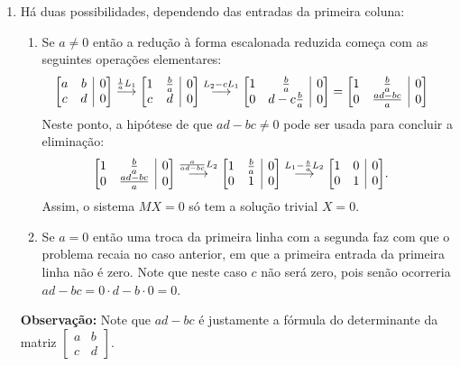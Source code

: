 \documentclass[12pt,a4paper]{article}
\makeatletter
\newenvironment{amatrix}[1]{%
  \left[\begin{array}{@{}*{#1}{c}|c@{}}
}{%
  \end{array}\right]
}
\newcommand{\grstep}[2][\relax]{%
   \ensuremath{\mathrel{
       {\mathop{\longrightarrow}\limits^{#2\mathstrut}_{
                                     \begin{subarray}{l} #1 \end{subarray}}}}}}
\makeatother
\begin{document}
\begin{enumerate}
\item Há duas possibilidades, dependendo das entradas da primeira coluna:
\begin{enumerate}
\item Se $a \neq 0$ então a redução à forma escalonada reduzida começa com as seguintes operações elementares:
\begin{align*}
\begin{amatrix}{2}
a & b & 0 \\
c & d & 0
\end{amatrix}
&
\grstep{ \frac{1}{a} L_1 }
\begin{amatrix}{2}
1 & \frac{b}{a} & 0 \\
c & d & 0
\end{amatrix}
\grstep{ L_2 - c L_1 }
\begin{amatrix}{2}
1 & \frac{b}{a} & 0 \\
0 & d-c\frac{b}{a} & 0
\end{amatrix}
=
\begin{amatrix}{2}
1 & \frac{b}{a} & 0 \\
0 & \frac{ad-bc}{a} & 0
\end{amatrix}
\end{align*}
Neste ponto, a hipótese de que $ad-bc \neq 0$ pode ser usada para concluir a eliminação:
\begin{align*}
\begin{amatrix}{2}
1 & \frac{b}{a} & 0 \\
0 & \frac{ad-bc}{a} & 0
\end{amatrix}
&
\grstep{ \frac{a}{ad-bc} L_2 }
\begin{amatrix}{2}
1 & \frac{b}{a} & 0 \\
0 & 1 & 0
\end{amatrix}
\grstep{ L_1 - \frac{b}{a} L_2 }
\begin{amatrix}{2}
1 & 0 & 0 \\
0 & 1 & 0
\end{amatrix}.
\end{align*}
Assim, o sistema $MX = 0$ só tem a solução trivial $X = 0$.

\item Se $a = 0$ então uma troca da primeira linha com a segunda faz com que o problema recaia no caso anterior, em que a primeira entrada da primeira linha não é zero. Note que neste caso $c$ não será zero, pois senão ocorreria $ad-bc = 0 \cdot d-b \cdot 0 = 0$.
\end{enumerate}
\textbf{Observação:} Note que $ad-bc$ é justamente a fórmula do determinante da matriz $\begin{bmatrix}
a & b \\
c & d
\end{bmatrix}$.


\end{enumerate}
\end{document}

